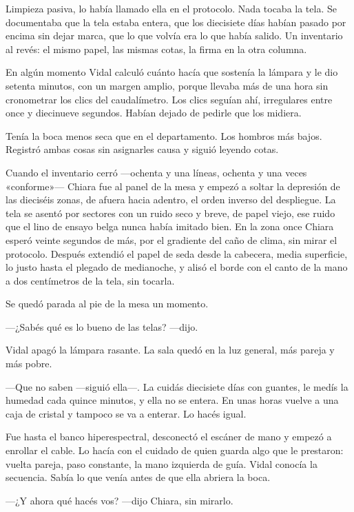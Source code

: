 Limpieza pasiva, lo había llamado ella en el protocolo. Nada tocaba la tela. Se documentaba que la tela estaba entera, que los diecisiete días habían pasado por encima sin dejar marca, que lo que volvía era lo que había salido. Un inventario al revés: el mismo papel, las mismas cotas, la firma en la otra columna.

En algún momento Vidal calculó cuánto hacía que sostenía la lámpara y le dio setenta minutos, con un margen amplio, porque llevaba más de una hora sin cronometrar los clics del caudalímetro. Los clics seguían ahí, irregulares entre once y diecinueve segundos. Habían dejado de pedirle que los midiera.

Tenía la boca menos seca que en el departamento. Los hombros más bajos. Registró ambas cosas sin asignarles causa y siguió leyendo cotas.

Cuando el inventario cerró ---ochenta y una líneas, ochenta y una veces «conforme»--- Chiara fue al panel de la mesa y empezó a soltar la depresión de las dieciséis zonas, de afuera hacia adentro, el orden inverso del despliegue. La tela se asentó por sectores con un ruido seco y breve, de papel viejo, ese ruido que el lino de ensayo belga nunca había imitado bien. En la zona once Chiara esperó veinte segundos de más, por el gradiente del caño de clima, sin mirar el protocolo. Después extendió el papel de seda desde la cabecera, media superficie, lo justo hasta el plegado de medianoche, y alisó el borde con el canto de la mano a dos centímetros de la tela, sin tocarla.

Se quedó parada al pie de la mesa un momento.

---¿Sabés qué es lo bueno de las telas? ---dijo.

Vidal apagó la lámpara rasante. La sala quedó en la luz general, más pareja y más pobre.

---Que no saben ---siguió ella---. La cuidás diecisiete días con guantes, le medís la humedad cada quince minutos, y ella no se entera. En unas horas vuelve a una caja de cristal y tampoco se va a enterar. Lo hacés igual.

Fue hasta el banco hiperespectral, desconectó el escáner de mano y empezó a enrollar el cable. Lo hacía con el cuidado de quien guarda algo que le prestaron: vuelta pareja, paso constante, la mano izquierda de guía. Vidal conocía la secuencia. Sabía lo que venía antes de que ella abriera la boca.

---¿Y ahora qué hacés vos? ---dijo Chiara, sin mirarlo.

